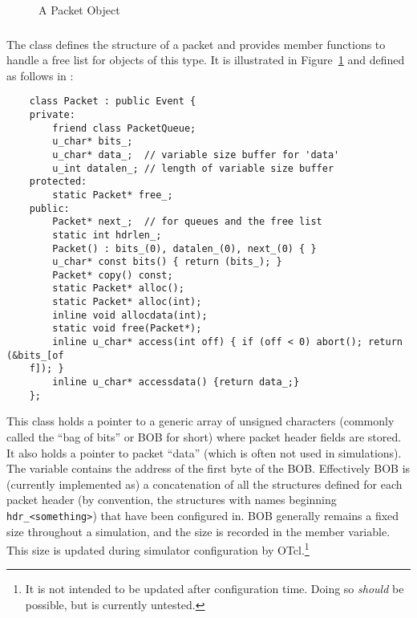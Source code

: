 \begin{figure}[h]
\centerline{}
\caption{\label{pic:packet}A Packet Object}
\end{figure}

\subsubsection{}

The  class defines the structure of a
packet and provides member functions to handle a
free list for objects of this type.
It is illustrated in Figure~\ref{pic:packet} and
defined as follows in :
\begin{small}
\begin{verbatim}
	class Packet : public Event {
	private:
		friend class PacketQueue;
		u_char* bits_;  
		u_char* data_;  // variable size buffer for 'data'
		u_int datalen_; // length of variable size buffer
	protected:
		static Packet* free_;
	public: 
		Packet* next_;  // for queues and the free list
		static int hdrlen_;
		Packet() : bits_(0), datalen_(0), next_(0) { }
		u_char* const bits() { return (bits_); }
		Packet* copy() const;
		static Packet* alloc();
		static Packet* alloc(int);
		inline void allocdata(int);
		static void free(Packet*);
		inline u_char* access(int off) { if (off < 0) abort(); return (&bits_[of
	f]); }  
		inline u_char* accessdata() {return data_;}
	};

\end{verbatim}
\end{small}
This class holds a pointer to a generic array of unsigned
characters (commonly called the ``bag of bits'' or BOB for short)
where packet header fields are stored.
It also holds a pointer to packet ``data'' (which is often not used in
simulations).
The  variable contains the address of
the first byte of the BOB.
Effectively BOB is (currently implemented as) a concatenation
of all the structures defined for each packet header (by convention,
the structures with names beginning {\tt hdr\_<something>}) that have
been configured in.
BOB generally remains a fixed size throughout a simulation, and
the size is recorded in the  member
variable.
This size is updated during simulator configuration by
OTcl.\footnote{It is not intended to be updated after configuration
time.  Doing so {\em should} be possible, but is currently untested.}

